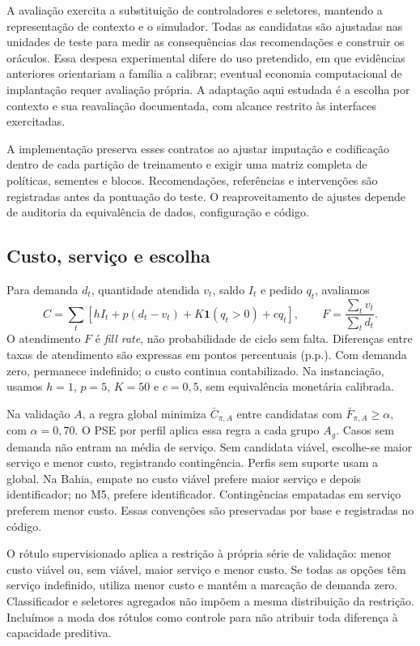\documentclass[preprint,12pt]{elsarticle}
\begin{document}
A avaliação exercita a substituição de controladores e seletores, mantendo a representação de contexto e o simulador. Todas as candidatas são ajustadas nas unidades de teste para medir as consequências das recomendações e construir os oráculos. Essa despesa experimental difere do uso pretendido, em que evidências anteriores orientariam a família a calibrar; eventual economia computacional de implantação requer avaliação própria. A adaptação aqui estudada é a escolha por contexto e sua reavaliação documentada, com alcance restrito às interfaces exercitadas.

A implementação preserva esses contratos ao ajustar imputação e codificação dentro de cada partição de treinamento e exigir uma matriz completa de políticas, sementes e blocos. Recomendações, referências e intervenções são registradas antes da pontuação do teste. O reaproveitamento de ajustes depende de auditoria da equivalência de dados, configuração e código.

\subsection{Custo, serviço e escolha}
Para demanda $d_t$, quantidade atendida $v_t$, saldo $I_t$ e pedido $q_t$, avaliamos
\begin{equation}
 C=\sum_t[hI_t+p(d_t-v_t)+K\mathbf1(q_t>0)+cq_t],
 \qquad F=\frac{\sum_t v_t}{\sum_t d_t}.
 \label{eq:metrics}
\end{equation}
O atendimento $F$ é \textit{fill rate}, não probabilidade de ciclo sem falta. Diferenças entre taxas de atendimento são expressas em pontos percentuais (p.p.). Com demanda zero, permanece indefinido; o custo continua contabilizado. Na instanciação, usamos $h=1$, $p=5$, $K=50$ e $c=0{,}5$, sem equivalência monetária calibrada.

Na validação $A$, a regra global minimiza $\bar C_{\pi,A}$ entre candidatas com $\bar F_{\pi,A}\geq\alpha$, com $\alpha=0{,}70$. O PSE por perfil aplica essa regra a cada grupo $A_g$. Casos sem demanda não entram na média de serviço. Sem candidata viável, escolhe-se maior serviço e menor custo, registrando contingência. Perfis sem suporte usam a global. Na Bahia, empate no custo viável prefere maior serviço e depois identificador; no M5, prefere identificador. Contingências empatadas em serviço preferem menor custo. Essas convenções são preservadas por base e registradas no código.

O rótulo supervisionado aplica a restrição à própria série de validação: menor custo viável ou, sem viável, maior serviço e menor custo. Se todas as opções têm serviço indefinido, utiliza menor custo e mantém a marcação de demanda zero. Classificador e seletores agregados não impõem a mesma distribuição da restrição. Incluímos a moda dos rótulos como controle para não atribuir toda diferença à capacidade preditiva.
\end{document}
